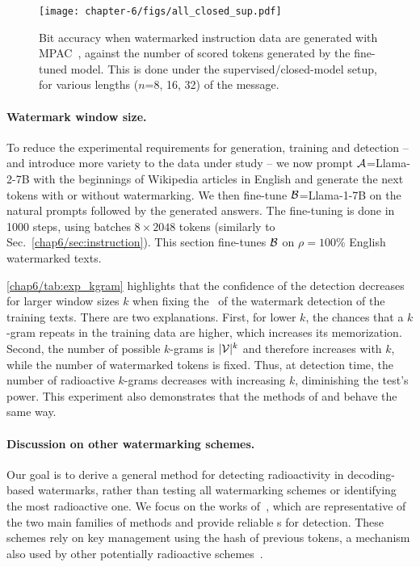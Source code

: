 \begin{figure}[b!]
    \centering
    \texttt{[image: chapter-6/figs/all\_closed\_sup.pdf]}
    \caption{
        Bit accuracy when watermarked instruction data are generated with MPAC~\citep{yoo2023advancing}, against the number of scored tokens generated by the fine-tuned model.
        This is done under the supervised/closed-model setup, for various lengths ($n$=8, 16, 32) of the message.
    }
    \label{chap6/fig:bit-accuracy}
\end{figure}







\paragraph{Watermark window size.} 
To reduce the experimental requirements for generation, training and detection -- and introduce more variety to the data under study -- we now prompt $\mathcal A$=Llama-2-7B with the beginnings of Wikipedia articles in English and generate the next tokens with or without watermarking. 
We then fine-tune $\mathcal B$=Llama-1-7B on the natural prompts followed by the generated answers.
The fine-tuning is done in 1000 steps, using batches $8\times2048$ tokens (similarly to Sec.~\ref{chap6/sec:instruction}).
This section fine-tunes $\mathcal B$ on $\rho=100\%$ English watermarked texts.

\autoref{chap6/tab:exp_kgram} highlights that the confidence of the detection decreases for larger window sizes $k$ when fixing the \pval\ of the watermark detection of the training texts.
There are two explanations. 
First, for lower $k$, the chances that a $k$-gram repeats in the training data are higher, which increases its memorization.
Second, the number of possible $k$-grams is $|\mathcal{V}|^k$ and therefore increases with $k$, while the number of watermarked tokens is fixed. 
Thus, at detection time, the number of radioactive $k$-grams decreases with increasing $k$, diminishing the test's power. 
This experiment also demonstrates that the methods of \cite{aaronson2023watermarking} and \cite{kirchenbauer2023reliability} behave the same way.

\paragraph{Discussion on other watermarking schemes.}
Our goal is to derive a general method for detecting radioactivity in decoding-based watermarks, rather than testing all watermarking schemes or identifying the most radioactive one. 
We focus on the works of~\citet{aaronson2023watermarking, kirchenbauer2023watermark}, which are representative of the two main families of methods and provide reliable \pval s for detection. These schemes rely on key management using the hash of previous tokens, a mechanism also used by other potentially radioactive schemes~\citep{lee2023wrote, fu2024gumbelsoft}.

